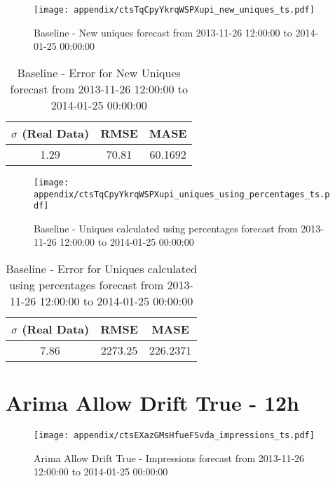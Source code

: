 \begin{figure}[H] \begin{center} \leavevmode
\texttt{[image: appendix/ctsTqCpyYkrqWSPXupi\_new\_uniques\_ts.pdf]} \caption{
Baseline - New uniques forecast from 2013-11-26 12:00:00 to 2014-01-25 00:00:00} \label{fig:appendix/ctsTqCpyYkrqWSPXupi_new_uniques_ts.pdf} \end{center}
\end{figure}

\begin{table}[H]
\centering
\footnotesize
\begin{tabular}{ccc}
$\sigma$ (Real Data) & RMSE & MASE   \\ \hline
1.29 & 70.81 & 60.1692 \\
\end{tabular}

\vspace{0.5cm}

\caption{
Baseline - Error for New Uniques forecast from 2013-11-26 12:00:00 to 2014-01-25 00:00:00}
\end{table}

\begin{figure}[H] \begin{center} \leavevmode
\texttt{[image: appendix/ctsTqCpyYkrqWSPXupi\_uniques\_using\_percentages\_ts.pdf]} \caption{
Baseline - Uniques calculated using percentages forecast from 2013-11-26 12:00:00 to 2014-01-25 00:00:00} \label{fig:appendix/ctsTqCpyYkrqWSPXupi_uniques_using_percentages_ts.pdf} \end{center}
\end{figure}

\begin{table}[H]
\centering
\footnotesize
\begin{tabular}{ccc}
$\sigma$ (Real Data) & RMSE & MASE   \\ \hline
7.86 & 2273.25 & 226.2371 \\
\end{tabular}

\vspace{0.5cm}

\caption{
Baseline - Error for Uniques calculated using percentages forecast from 2013-11-26 12:00:00 to 2014-01-25 00:00:00}
\end{table}

\section{Arima Allow Drift True - 12h}
\begin{figure}[H] \begin{center} \leavevmode
\texttt{[image: appendix/ctsEXazGMsHfueFSvda\_impressions\_ts.pdf]} \caption{
Arima Allow Drift True - Impressions forecast from 2013-11-26 12:00:00 to 2014-01-25 00:00:00} \label{fig:appendix/ctsEXazGMsHfueFSvda_impressions_ts.pdf} \end{center}
\end{figure}

